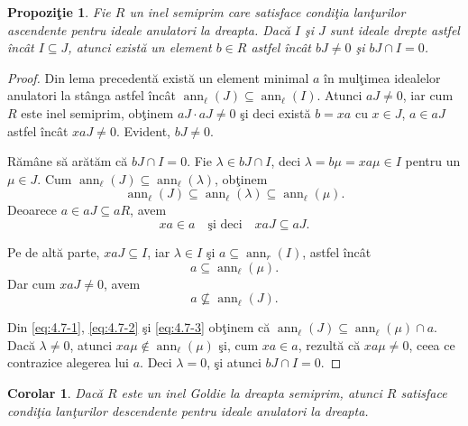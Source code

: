 \documentclass[12pt,a4paper]{book}
\theoremstyle{plain}
\newtheorem{proposition}[theorem]{Propoziţie}
\newtheorem{corollary}[theorem]{Corolar}
\theoremstyle{definition}
\theoremstyle{remark}
\begin{document}
\begin{proposition}
Fie \(R\) un inel semiprim care satisface condiţia lanţurilor ascendente
pentru ideale anulatori la dreapta.
Dacă \(I\) şi \(J\) sunt ideale drepte astfel încât \(I \subseteq J\),
atunci există un element \(b \in R\) astfel încât \(bJ \neq 0\) şi \(bJ \cap I = 0\).
\end{proposition}

\begin{proof}
Din lema precedentă există un element minimal \(a\) în mulţimea idealelor
anulatori la stânga astfel încât
\(\operatorname{ann}_\ell(J) \subseteq \operatorname{ann}_\ell(I)\).
Atunci \(aJ \neq 0\), iar cum \(R\) este inel semiprim, obţinem
\(aJ \cdot aJ \neq 0\) şi deci există \(b = x a\) cu \(x \in J\), \(a \in aJ\)
astfel încât \(x a J \neq 0\).
Evident, \(bJ \neq 0\).

Rămâne să arătăm că \(bJ \cap I = 0\).
Fie \(\lambda \in bJ \cap I\), deci \(\lambda = b\mu = x a \mu \in I\) pentru un
\(\mu \in J\).
Cum \(\operatorname{ann}_\ell(J) \subseteq \operatorname{ann}_\ell(\lambda)\),
obţinem
\[
  \operatorname{ann}_\ell(J) \subseteq \operatorname{ann}_\ell(\lambda)
  \subseteq \operatorname{ann}_\ell(\mu).
\]
Deoarece \(a \in aJ \subseteq aR\), avem
\begin{equation}\label{eq:4.7-1}
  x a \in a \quad \text{şi deci} \quad x a J \subseteq aJ .
\end{equation}

Pe de altă parte, \(x a J \subseteq I\), iar \(\lambda \in I\) şi
\(a \subseteq \operatorname{ann}_r(I)\), astfel încât
\begin{equation}\label{eq:4.7-2}
  a \subseteq \operatorname{ann}_\ell(\mu).
\end{equation}
Dar cum \(x a J \neq 0\), avem
\begin{equation}\label{eq:4.7-3}
  a \nsubseteq \operatorname{ann}_\ell(J).
\end{equation}

Din \eqref{eq:4.7-1}, \eqref{eq:4.7-2} şi \eqref{eq:4.7-3} obţinem că
\(\operatorname{ann}_\ell(J) \subseteq \operatorname{ann}_\ell(\mu) \cap a\).
Dacă \(\lambda \neq 0\), atunci \(x a \mu \notin \operatorname{ann}_\ell(\mu)\) şi,
cum \(x a \in a\), rezultă că \(x a \mu \neq 0\), ceea ce contrazice
alegerea lui \(a\).
Deci \(\lambda = 0\), şi atunci \(bJ \cap I = 0\).
\end{proof}



\begin{corollary}
Dacă \(R\) este un inel Goldie la dreapta semiprim, atunci \(R\) satisface
condiţia lanţurilor descendente pentru ideale anulatori la dreapta.
\end{corollary}
\end{document}
